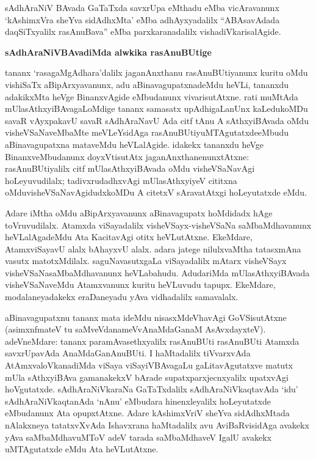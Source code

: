 sAdhAraNiV BAvada GaTaTxda savxrUpa eMthadu eMba vicAravanunx `kAshimxVra sheYva sidAdhxMta' eMba adhAyxyadalilx ``ABAsavAdada daqSiTxyalilx rasAnuBava'' eMba parxkaranadalilx vishadiVkarisalAgide.

\bigskip
\begin{center}
{\Large\bf sAdhAraNiVBAvadiMda alwkika rasAnuBUtige}
\end{center}

tananx `rasagaMgAdhara'dalilx jaganAnxthanu rasAnuBUtiyanunx kuritu oMdu vishiSaTx aBipArxyavanunx, adu aBinavagupatxnadeMdu heVLi, tananxdu adakikxMta heVge BinanxvAgide eMbudanunx vivarisutAtxne. rati muMtAda mUlasAthxyiBAvagaLoMdige tananx samasatx upAdhigaLanUnx kaLedukoMDu savaR vAyxpakavU savaR sAdhAraNavU Ada citf tAnu A sAthxyiBAvada oMdu visheVSaNaveMbaMte meVLeYsidAga rasAnuBUtiyuMTAgutatxde\break eMbudu aBinavagupatxna mataveMdu heVLalAgide. idakekx tananxdu heVge Binanx\-veMbudanunx doyxVtisutAtx jaganAnxthanenunxtAtxne: rasAnuBUtiyalilx citf mUlasAthxyiBAvada oMdu visheVSaNavAgi hoLeyuvudilalx; tadivxrudadhxvAgi mUlasAthxyiyeV cititxna oMdu\break visheVSaNavAgidudxkoMDu A citetxV sAravatAtxgi hoLeyutatxde eMdu.

Adare iMtha oMdu aBipArxyavanunx aBinavagupatx hoMdidadx hAge toVruvu\-dilalx. Atamxda viSayadalilx visheVSayx-visheVSaNa saMbaMdhavanunx heVLalAgadeMdu Ata KacitavAgi otitx heVLutAtxne. EkeMdare, AtamxviSayavU alalx bAhayxvU alalx. adara jatege nilulxvaMtha tatasxmAna vasutx matotxMdilalx. saguNavasutxgaLa viSayadalilx mAtarx visheVSayx visheVSaNasaMbaMdhavanunx heVLabahudu. AdudariMda mUlasAthxyiBAvada visheVSaNaveMdu Atamxvanunx kuritu heVLuvudu tapupx. EkeMdare, modalaneyadakekx eraDaneyadu yAva vidhadalilx samavalalx.

aBinavagupatxnu tananx mata ideMdu nisasxMdeVhavAgi GoVSisutAtxne (asimxnfmateV tu saMveVdanameVvAnaMdaGanaM AsAvxdayxteV). adeVneMdare: tananx paramAvasethxyalilx rasAnuBUti rasAnuBUti Atamxda savxrUpavAda AnaMdaGanAnuBUti. I haMtadalilx tiVvarxvAda AtAmxvaloVkanadiMda viSaya viSayiVBAvagaLu gaLitavAgutatxve matutx mUla sAthxyiBAva gamanakekxV bArade supatxparxjecnxyalilx upatxvAgi hoVgutatxde. sAdhAraNiVkaraNa GaTaTxdalilx sAdhAraNiVkaqtavAda `idu' sAdhAraNiVkaqtanAda `nAnu' eMbudara hinenxleyalilx hoLeyutatxde eMbudanunx Ata opupxtAtxne. Adare kAshimxVriV sheYva sidAdhxMtada nAlakxneya tatatxvXvAda Ishavxrana haMtadalilx avu AviBaRvisidAga avakekx yAva saMbaMdhavuMToV adeV tarada saMbaMdhaveV IgalU avakekx uMTAgutatxde eMdu Ata heVLutAtxne.

